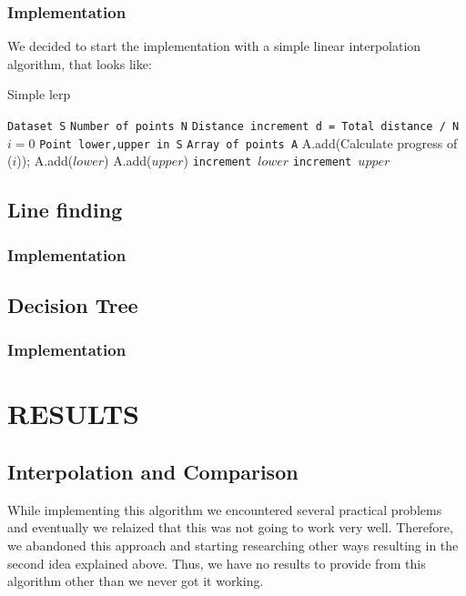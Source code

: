\documentclass[a4paper, 10pt, conference]{ieeeconf}      %
\begin{document}
\subsubsection{Implementation}
We decided to start the implementation with a simple linear interpolation algorithm, that looks like:

\begin{algorithm}
  \caption{Simple lerp}\label{forward}
  \begin{algorithmic}[1]
      \State \texttt{Dataset S}
      \State \texttt{Number of points N}
      \State \texttt{Distance increment d = Total distance / N}
      \State \texttt{$i = 0$}
      \State \texttt{Point lower,upper in S}
      \State \texttt{Array of points A}
      		\State A.add(Calculate progress of ($i$));
      		\State A.add($lower$)
      		\State A.add($upper$)
      	\Else
      			\State \texttt{increment $lower$}
      			\State \texttt{increment $upper$}
      		\EndWhile
      	\EndIf
      \EndWhile
  \end{algorithmic}
\end{algorithm}

\subsection{Line finding}

\subsubsection{Implementation}

\subsection{Decision Tree}

\subsubsection{Implementation}

\section{RESULTS}

\subsection{Interpolation and Comparison}
While implementing this algorithm we encountered several practical problems and eventually we relaized that this was not going to work very well. Therefore, we abandoned this approach and starting researching other ways resulting in the second idea explained above. Thus, we have no results to provide from this algorithm other than we never got it working.
\end{document}
